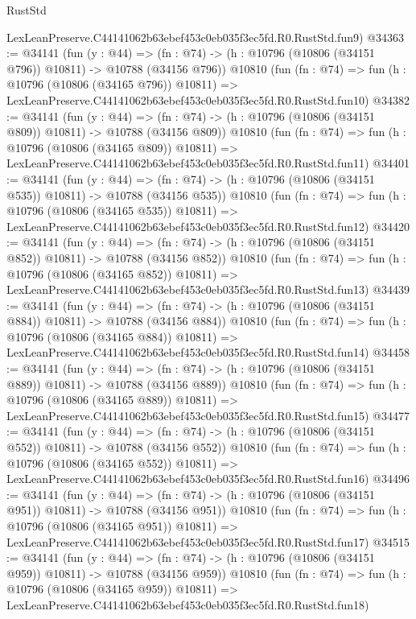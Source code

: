 \begin{lexlean}{RustStd}
\begin{coremodule}
    LexLeanPreserve.C44141062b63ebef453c0eb035f3ec5fd.R0.RustStd.fun9)
@34363 := @34141
    (fun (y : @44) =>
    (fn : @74) -> (h : @10796 (@10806 (@34151 @796)) @10811) -> @10788 (@34156 @796))
    @10810
    (fun (fn : @74) =>
    fun (h : @10796 (@10806 (@34165 @796)) @10811) =>
    LexLeanPreserve.C44141062b63ebef453c0eb035f3ec5fd.R0.RustStd.fun10)
@34382 := @34141
    (fun (y : @44) =>
    (fn : @74) -> (h : @10796 (@10806 (@34151 @809)) @10811) -> @10788 (@34156 @809))
    @10810
    (fun (fn : @74) =>
    fun (h : @10796 (@10806 (@34165 @809)) @10811) =>
    LexLeanPreserve.C44141062b63ebef453c0eb035f3ec5fd.R0.RustStd.fun11)
@34401 := @34141
    (fun (y : @44) =>
    (fn : @74) -> (h : @10796 (@10806 (@34151 @535)) @10811) -> @10788 (@34156 @535))
    @10810
    (fun (fn : @74) =>
    fun (h : @10796 (@10806 (@34165 @535)) @10811) =>
    LexLeanPreserve.C44141062b63ebef453c0eb035f3ec5fd.R0.RustStd.fun12)
@34420 := @34141
    (fun (y : @44) =>
    (fn : @74) -> (h : @10796 (@10806 (@34151 @852)) @10811) -> @10788 (@34156 @852))
    @10810
    (fun (fn : @74) =>
    fun (h : @10796 (@10806 (@34165 @852)) @10811) =>
    LexLeanPreserve.C44141062b63ebef453c0eb035f3ec5fd.R0.RustStd.fun13)
@34439 := @34141
    (fun (y : @44) =>
    (fn : @74) -> (h : @10796 (@10806 (@34151 @884)) @10811) -> @10788 (@34156 @884))
    @10810
    (fun (fn : @74) =>
    fun (h : @10796 (@10806 (@34165 @884)) @10811) =>
    LexLeanPreserve.C44141062b63ebef453c0eb035f3ec5fd.R0.RustStd.fun14)
@34458 := @34141
    (fun (y : @44) =>
    (fn : @74) -> (h : @10796 (@10806 (@34151 @889)) @10811) -> @10788 (@34156 @889))
    @10810
    (fun (fn : @74) =>
    fun (h : @10796 (@10806 (@34165 @889)) @10811) =>
    LexLeanPreserve.C44141062b63ebef453c0eb035f3ec5fd.R0.RustStd.fun15)
@34477 := @34141
    (fun (y : @44) =>
    (fn : @74) -> (h : @10796 (@10806 (@34151 @552)) @10811) -> @10788 (@34156 @552))
    @10810
    (fun (fn : @74) =>
    fun (h : @10796 (@10806 (@34165 @552)) @10811) =>
    LexLeanPreserve.C44141062b63ebef453c0eb035f3ec5fd.R0.RustStd.fun16)
@34496 := @34141
    (fun (y : @44) =>
    (fn : @74) -> (h : @10796 (@10806 (@34151 @951)) @10811) -> @10788 (@34156 @951))
    @10810
    (fun (fn : @74) =>
    fun (h : @10796 (@10806 (@34165 @951)) @10811) =>
    LexLeanPreserve.C44141062b63ebef453c0eb035f3ec5fd.R0.RustStd.fun17)
@34515 := @34141
    (fun (y : @44) =>
    (fn : @74) -> (h : @10796 (@10806 (@34151 @959)) @10811) -> @10788 (@34156 @959))
    @10810
    (fun (fn : @74) =>
    fun (h : @10796 (@10806 (@34165 @959)) @10811) =>
    LexLeanPreserve.C44141062b63ebef453c0eb035f3ec5fd.R0.RustStd.fun18)

\end{coremodule}
\end{lexlean}
